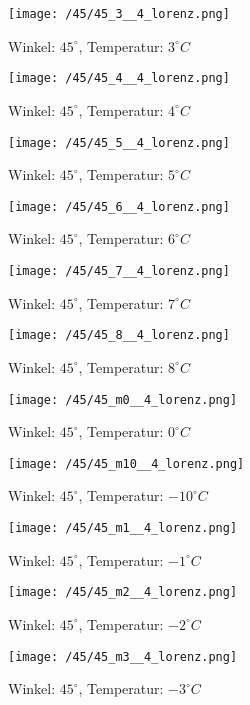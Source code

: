 \begin{figure}[c]
\centering
\texttt{[image: /45/45\_3\_\_4\_lorenz.png]}
\caption{Winkel: $ 45^\circ$, Temperatur: $ 3^\circ C$}
\end{figure}
\clearpage
\begin{figure}[c]
\centering
\texttt{[image: /45/45\_4\_\_4\_lorenz.png]}
\caption{Winkel: $ 45^\circ$, Temperatur: $ 4^\circ C$}
\end{figure}
\begin{figure}[c]
\centering
\texttt{[image: /45/45\_5\_\_4\_lorenz.png]}
\caption{Winkel: $ 45^\circ$, Temperatur: $ 5^\circ C$}
\end{figure}
\clearpage
\begin{figure}[c]
\centering
\texttt{[image: /45/45\_6\_\_4\_lorenz.png]}
\caption{Winkel: $ 45^\circ$, Temperatur: $ 6^\circ C$}
\end{figure}
\begin{figure}[c]
\centering
\texttt{[image: /45/45\_7\_\_4\_lorenz.png]}
\caption{Winkel: $ 45^\circ$, Temperatur: $ 7^\circ C$}
\end{figure}
\clearpage
\begin{figure}[c]
\centering
\texttt{[image: /45/45\_8\_\_4\_lorenz.png]}
\caption{Winkel: $ 45^\circ$, Temperatur: $ 8^\circ C$}
\end{figure}
\begin{figure}[c]
\centering
\texttt{[image: /45/45\_m0\_\_4\_lorenz.png]}
\caption{Winkel: $ 45^\circ$, Temperatur: $ 0^\circ C$}
\end{figure}
\clearpage
\begin{figure}[c]
\centering
\texttt{[image: /45/45\_m10\_\_4\_lorenz.png]}
\caption{Winkel: $ 45^\circ$, Temperatur: $ -10^\circ C$}
\end{figure}
\begin{figure}[c]
\centering
\texttt{[image: /45/45\_m1\_\_4\_lorenz.png]}
\caption{Winkel: $ 45^\circ$, Temperatur: $ -1^\circ C$}
\end{figure}
\clearpage
\begin{figure}[c]
\centering
\texttt{[image: /45/45\_m2\_\_4\_lorenz.png]}
\caption{Winkel: $ 45^\circ$, Temperatur: $ -2^\circ C$}
\end{figure}
\begin{figure}[c]
\centering
\texttt{[image: /45/45\_m3\_\_4\_lorenz.png]}
\caption{Winkel: $ 45^\circ$, Temperatur: $ -3^\circ C$}
\end{figure}

